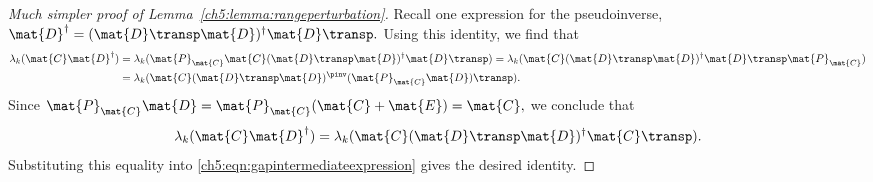 \begin{proof}[Much simpler proof of Lemma~\ref{ch5:lemma:rangeperturbation}]
Recall one expression for the pseudoinverse, $\mat{D}^\dagger = (\mat{D}\transp
\mat{D})^\dagger \mat{D}\transp.$ Using this identity, we find that
\begin{align*}
\lambda_k(\mat{C} \mat{D}^\dagger) & = \lambda_k(\mat{P}_{\mat{C}} \mat{C}
(\mat{D}\transp \mat{D})^\dagger \mat{D}\transp) =  \lambda_k(\mat{C}
(\mat{D}\transp \mat{D})^\dagger \mat{D}\transp \mat{P}_{\mat{C}}) \\
 & = \lambda_k(\mat{C} (\mat{D}\transp \mat{D})^\pinv (\mat{P}_{\mat{C}}
\mat{D})\transp).
\end{align*}
Since $\mat{P}_{\mat{C}} \mat{D} = \mat{P}_{\mat{C}}(\mat{C} + \mat{E}) =
\mat{C},$ we conclude that
\[
\lambda_k(\mat{C}\mat{D}^\dagger) = \lambda_k(\mat{C}(\mat{D}\transp
\mat{D})^\dagger \mat{C}\transp).
\]
Substituting this equality into \eqref{ch5:eqn:gapintermediateexpression} gives the
desired identity.
\end{proof}

